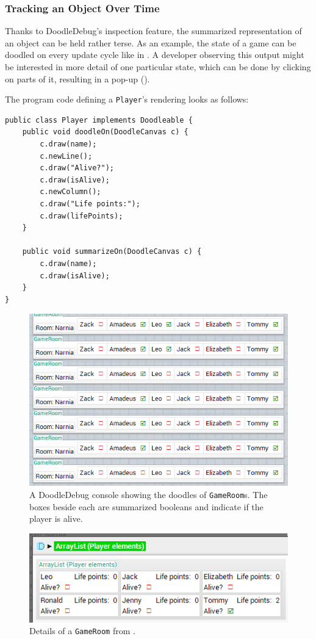 \documentclass[english]{scrartcl}
\newcommand{\DD}{Dood\-le\-De\-bug\xspace}
\begin{document}
\subsubsection{Tracking an Object Over Time}

Thanks to \DD's inspection feature, the summarized representation of an object can be held rather terse.
As an example, the state of a game can be doodled on every update cycle like in .
A developer observing this output might be interested in more detail of one particular state, which can be done by clicking on parts of it, resulting in a pop-up ().

The program code defining a \texttt{Player}'s rendering looks as follows:
\begin{lstlisting}
public class Player implements Doodleable {
	public void doodleOn(DoodleCanvas c) {
		c.draw(name);
		c.newLine();
		c.draw("Alive?");
		c.draw(isAlive);
		c.newColumn();
		c.draw("Life points:");
		c.draw(lifePoints);
	}

	public void summarizeOn(DoodleCanvas c) {
		c.draw(name);
		c.draw(isAlive);
	}
}
\end{lstlisting}

\begin{figure}[h]
	\includegraphics[width=\linewidth]{img/game_long-list.png}
	\caption[Example of a chronological sequence: Game]{A DoodleDebug console showing the doodles of \texttt{GameRoom}s. The boxes beside each are summarized booleans and indicate if the player is alive.}
\end{figure}

\begin{figure}[h]
	\includegraphics[width=\linewidth]{img/game_last-state.png}
	\caption[Example of a chronological sequence: Detailed player list]{Details of a \texttt{GameRoom} from .}
\end{figure}
\end{document}
